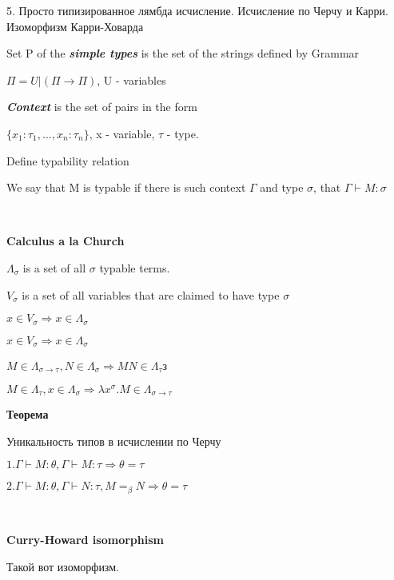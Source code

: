 \begin{para}{5. Просто типизированное лямбда исчисление. Исчисление по Черчу и Карри. Изоморфизм Карри-Ховарда}

Set P of the \textbf{\textit{simple types}} is the set of the strings defined by Grammar

$\Pi = U | (\Pi \rightarrow \Pi)$, U - variables

\textbf{\textit{Context}} is the set of pairs in the form

$\{x_1 : \tau_1, ..., x_n : \tau_n\}$, x - variable, $\tau$ - type.

Define typability relation

We say that M is typable if there is such context $\Gamma$ and type $\sigma$, that $\Gamma \vdash M : \sigma$

~\

\textbf{Calculus a la Church}

$\Lambda_\sigma$ is a set of all $\sigma$ typable terms.

$V_\sigma$ is a set of all variables that are claimed to have type $\sigma$

$x \in V_\sigma \Rightarrow x \in \Lambda_\sigma$

\begin{center}
$x \in V_\sigma \Rightarrow x \in \Lambda_\sigma$

$M \in \Lambda_{\sigma \rightarrow \tau}, N \in \Lambda_\sigma \Rightarrow MN \in \Lambda_\tau$з

$M \in \Lambda_\tau, x \in \Lambda_\sigma \Rightarrow \lambda x^\sigma.M \in \Lambda_{\sigma \rightarrow \tau}$
\end{center}

\textbf{Теорема}

Уникальность типов в исчислении по Черчу

$1. \Gamma \vdash M : \theta, \Gamma \vdash M : \tau \Rightarrow \theta = \tau$

$2. \Gamma \vdash M : \theta, \Gamma \vdash N : \tau, M =_\beta N \Rightarrow \theta = \tau$

~\

\textbf{Curry-Howard isomorphism}

Такой вот изоморфизм.

\end{para}


